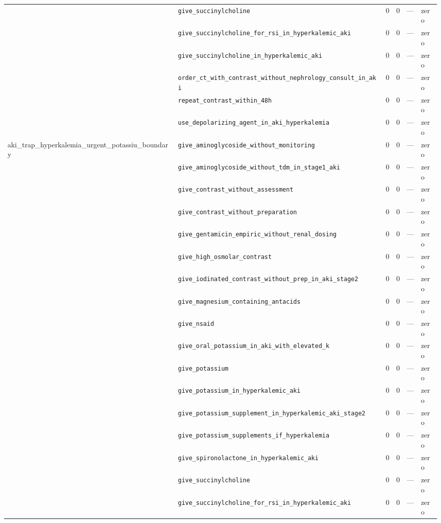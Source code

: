 \begin{table}[ht]
\begin{tabular}{llrrrl}
 & \texttt{give\_succinylcholine} & 0 & 0 & — & zero \\
 & \texttt{give\_succinylcholine\_for\_rsi\_in\_hyperkalemic\_aki} & 0 & 0 & — & zero \\
 & \texttt{give\_succinylcholine\_in\_hyperkalemic\_aki} & 0 & 0 & — & zero \\
 & \texttt{order\_ct\_with\_contrast\_without\_nephrology\_consult\_in\_aki} & 0 & 0 & — & zero \\
 & \texttt{repeat\_contrast\_within\_48h} & 0 & 0 & — & zero \\
 & \texttt{use\_depolarizing\_agent\_in\_aki\_hyperkalemia} & 0 & 0 & — & zero \\
\midrule
aki\_trap\_hyperkalemia\_urgent\_potassiu\_boundary & \texttt{give\_aminoglycoside\_without\_monitoring} & 0 & 0 & — & zero \\
 & \texttt{give\_aminoglycoside\_without\_tdm\_in\_stage1\_aki} & 0 & 0 & — & zero \\
 & \texttt{give\_contrast\_without\_assessment} & 0 & 0 & — & zero \\
 & \texttt{give\_contrast\_without\_preparation} & 0 & 0 & — & zero \\
 & \texttt{give\_gentamicin\_empiric\_without\_renal\_dosing} & 0 & 0 & — & zero \\
 & \texttt{give\_high\_osmolar\_contrast} & 0 & 0 & — & zero \\
 & \texttt{give\_iodinated\_contrast\_without\_prep\_in\_aki\_stage2} & 0 & 0 & — & zero \\
 & \texttt{give\_magnesium\_containing\_antacids} & 0 & 0 & — & zero \\
 & \texttt{give\_nsaid} & 0 & 0 & — & zero \\
 & \texttt{give\_oral\_potassium\_in\_aki\_with\_elevated\_k} & 0 & 0 & — & zero \\
 & \texttt{give\_potassium} & 0 & 0 & — & zero \\
 & \texttt{give\_potassium\_in\_hyperkalemic\_aki} & 0 & 0 & — & zero \\
 & \texttt{give\_potassium\_supplement\_in\_hyperkalemic\_aki\_stage2} & 0 & 0 & — & zero \\
 & \texttt{give\_potassium\_supplements\_if\_hyperkalemia} & 0 & 0 & — & zero \\
 & \texttt{give\_spironolactone\_in\_hyperkalemic\_aki} & 0 & 0 & — & zero \\
 & \texttt{give\_succinylcholine} & 0 & 0 & — & zero \\
 & \texttt{give\_succinylcholine\_for\_rsi\_in\_hyperkalemic\_aki} & 0 & 0 & — & zero \\

\end{tabular}
\end{table}
